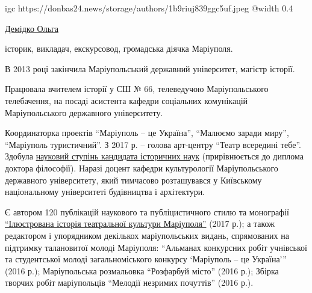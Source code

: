  
 
 
 
 

\clearpage

\begingroup
\small

\ifcmt
  igc https://donbas24.news/storage/authors/1b9riuj839ggc5uf.jpeg
  @width 0.4
\fi

\href{https://donbas24.news/author/olga-demidko}{Демідко Ольга}

історик, викладач, екскурсовод, громадська діячка Маріуполя.

В 2013 році закінчила Маріупольський державний університет, магістр історії.

Працювала вчителем історії у СШ № 66, телеведучою Маріупольського телебачення,
на посаді асистента кафедри соціальних комунікацій Маріупольського державного
університету.

Координаторка проектів \enquote{Маріуполь – це Україна}, \enquote{Малюємо
заради миру}, \enquote{Маріуполь туристичний}. З 2017 р. – голова арт-центру
\enquote{Театр всередині тебе}.  Здобула
\href{https://archive.org/details/book.2019.olga_demidko.dissertacia}{науковий
ступінь кандидата історичних наук} (прирівнюється до диплома доктора
філософії). Наразі доцент кафедри культурології Маріупольського державного
університету, який тимчасово розташувався у Київському національному
університеті будівництва і архітектури.

Є автором 120 публікацій наукового та публіцистичного стилю та монографії
\href{https://archive.org/details/book.2017.olga_demidko.iljustrovana_istoria_teatralnoi_kultury_mariupolja}{%
\enquote{Ілюстрована історія театральної культури Маріуполя}} (2017 р.); а також
редактором і упорядником декількох маріупольських видань, спрямованих на
підтримку талановитої молоді Маріуполя: \enquote{Альманах конкурсних робіт учнівської
та студентської молоді загальноміського конкурсу \enquote{Маріуполь – це Україна}} (2016
р.); Маріупольська розмальовка \enquote{Розфарбуй місто} (2016 р.); Збірка творчих
робіт маріупольців \enquote{Мелодії незримих почуттів} (2016 р.). 

